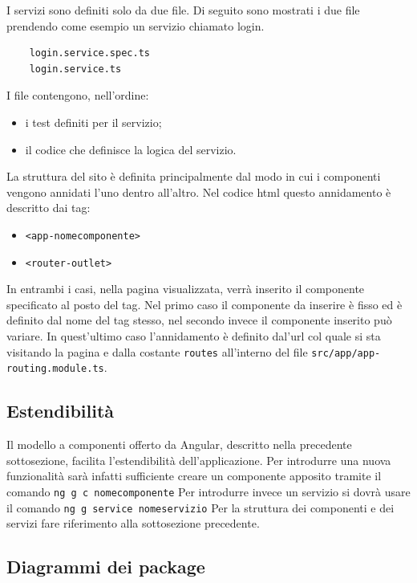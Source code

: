 I servizi sono definiti solo da due file. Di seguito sono mostrati i due file prendendo come esempio un servizio chiamato login. 
\begin{verbatim}
	login.service.spec.ts
	login.service.ts
\end{verbatim}
I file contengono, nell'ordine:
\begin{itemize}
	\item i test definiti per il servizio;
	\item il codice che definisce la logica del servizio.
\end{itemize}

La struttura del sito è definita principalmente dal modo in cui i componenti vengono annidati l'uno dentro all'altro. Nel codice html questo annidamento è descritto dai tag:
\begin{itemize}
	\item \texttt{<app-nomecomponente>}
	\item \texttt{<router-outlet>}
\end{itemize}
In entrambi i casi, nella pagina visualizzata, verrà inserito il componente specificato al posto del tag. Nel primo caso il componente da inserire è fisso ed è definito dal nome del tag stesso, nel secondo invece il componente inserito può variare. In quest'ultimo caso l'annidamento è definito dal'url col quale si sta visitando la pagina e dalla costante \texttt{routes} all'interno del file \texttt{src/app/app-routing.module.ts}.

\subsection{Estendibilità}
Il modello a componenti offerto da Angular, descritto nella precedente sottosezione, facilita l'estendibilità dell'applicazione. Per introdurre una nuova funzionalità sarà infatti sufficiente creare un componente apposito tramite il comando \newline
	\texttt{ng g c nomecomponente} \newline
Per introdurre invece un servizio si dovrà usare il comando \newline
	\texttt{ng g service nomeservizio} \newline
Per la struttura dei componenti e dei servizi fare riferimento alla sottosezione precedente.

\subsection{Diagrammi dei package}

